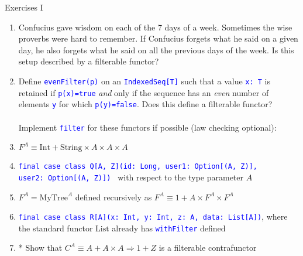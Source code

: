 \documentclass[english]{beamer}
\begin{document}
\begin{frame}{Exercises I}
\begin{enumerate}
\item Confucius gave wisdom on each of the 7 days of a week. Sometimes the
wise proverbs were hard to remember. If Confucius forgets what he
said on a given day, he also forgets what he said on all the previous
days of the week. Is this setup described by a filterable functor?
\item Define \texttt{\textcolor{blue}{\footnotesize{}evenFilter(p)}} on
an \texttt{\textcolor{blue}{\footnotesize{}IndexedSeq{[}T{]}}} such
that a value \texttt{\textcolor{blue}{\footnotesize{}x:\ T}} is retained
if \texttt{\textcolor{blue}{\footnotesize{}p(x)=true}} \emph{and}
only if the sequence has an \emph{even} number of elements \texttt{\textcolor{blue}{\footnotesize{}y}}
for which \texttt{\textcolor{blue}{\footnotesize{}p(y)=false}}. Does
this define a filterable functor?\\
\ \\
Implement \texttt{\textcolor{blue}{\footnotesize{}filter}} for these
functors if possible (law checking optional):
\item $F^{A}\equiv\text{Int}+\text{String}\times A\times A\times A$
\item \texttt{\textcolor{blue}{\footnotesize{}final case class Q{[}A, Z{]}(id:\ Long,
user1:\ Option{[}(A, Z){]}, user2:\ Option{[}(A, Z){]}) }}\textendash{}
with respect to the type parameter $A$
\item $F^{A}=\text{MyTree}^{A}$ defined recursively as $F^{A}\equiv1+A\times F^{A}\times F^{A}$
\item \texttt{\textcolor{blue}{\footnotesize{}final case class R{[}A{]}(x:\ Int,\ y: Int,
z:\ A, data:\ List{[}A{]})}}, where the standard functor $\text{List}$
already has \texttt{\textcolor{blue}{\footnotesize{}withFilter}} defined
\item {*} Show that $C^{A}\equiv A+A\times A\Rightarrow1+Z$ is a filterable
contrafunctor
\end{enumerate}
\end{frame}
\end{document}

